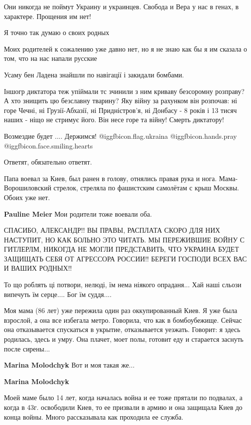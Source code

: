 \begin{itemize}
Они никогда не поймут Украину и украинцев. Свобода и Вера у нас в генах, в
характере. Прощения им нет!

Я точно так думаю о своих родных


Моих родителей к сожалению уже давно нет, но я не знаю как бы я им сказала о
том, что на нас напали русские


Усаму бен Ладена знайшли по навігації і закидали бомбами.

Іншогр диктатора теж упіймали тс зчинили з ним криваву безсоромну розправу? А
хто знищить цю безславну тварину? Яку війну за рахунком він розпочав: ні горе
Чечні, ні Грузії-Абхазії, ні Придністров'я, ні Донбасу - 8 років і 13 тисяч
наших - ніщо не стримує його. Він несе горе та війну! Смерть диктатору!

Возмездие будет .... Держимся! @igg{fbicon.flag.ukraina}  @igg{fbicon.hands.pray}  @igg{fbicon.face.smiling.hearts} 

Ответят, обязательно ответят.


Папа воевал за Киев, был ранен в голову, отнялись правая рука и нога. Мама-
Ворошиловский стрелок, стреляла по фашистским самолётам с крыш Москвы. Обоих
уже нет.

\textbf{Pauline Meier} Мои родители тоже воевали оба.


СПАСИБО, АЛЕКСАНДР!! ВЫ ПРАВЫ, РАСПЛАТА СКОРО ДЛЯ НИХ НАСТУПИТ, НО КАК БОЛЬНО ЭТО
ЧИТАТЬ. МЫ ПЕРЕЖИВШИЕ ВОЙНУ С ГИТЛЕРЛМ, НИКОГДА НЕ МОГЛИ ПРЕДСТАВИТЬ, ЧТО УКРАИНА
БУДЕТ ЗАЩИЩАТЬ СЕБЯ ОТ АГРЕССОРА РОССИИ!! БЕРЕГИ ГОСПОДИ ВСЕХ ВАС И ВАШИХ
РОДНЫХ!!


То що роблять ці потвори, нелюді, їм нема ніякого опраданя... Хай наші сльози
випечуть їм серце.... Бог їм суддя....


Моя мама (86 лет) уже пережила один раз оккупированный Киев. Я уже была
взрослой, а она все избегала метро. Говорила, что как в бомбоубежище. Сейчас
она отказывается спускаться в укрытие, отказывается уезжать. Говорит: я здесь
родилась, здесь и умру. Она плачет, моет полы, готовит еду и старается заснуть
после сирены...

\begin{itemize} %
\textbf{Marina Molodchyk} Вот и моя такая же...

\textbf{Marina Molodchyk} 

Моей маме было 14 лет, когда началась война и ее тоже прятали по подвалах, а
когда в 43г. освободили Киев, то ее призвали в армию и она защищала Киев до
конца войны. Много рассказывала как проходила ее служба.

\end{itemize} %

\end{itemize} %
